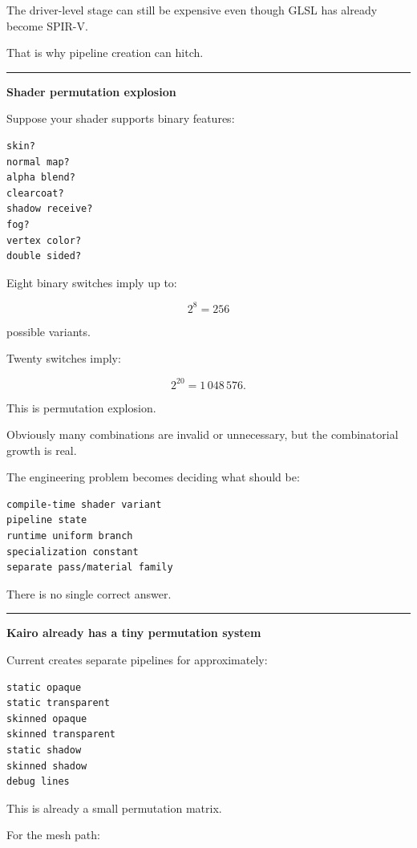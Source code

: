 The driver-level stage can still be expensive even though GLSL has already become SPIR-V.

That is why pipeline creation can hitch.

\begin{center}\rule{0.5\linewidth}{0.5pt}\end{center}

\textbf{Shader permutation explosion}

Suppose your shader supports binary features:

\begin{verbatim}
skin?
normal map?
alpha blend?
clearcoat?
shadow receive?
fog?
vertex color?
double sided?
\end{verbatim}

Eight binary switches imply up to:

\[
2^8=256
\]

possible variants.

Twenty switches imply:

\[
2^{20}=1\,048\,576.
\]

This is permutation explosion.

Obviously many combinations are invalid or unnecessary, but the combinatorial growth is real.

The engineering problem becomes deciding what should be:

\begin{verbatim}
compile-time shader variant
pipeline state
runtime uniform branch
specialization constant
separate pass/material family
\end{verbatim}

There is no single correct answer.

\begin{center}\rule{0.5\linewidth}{0.5pt}\end{center}

\textbf{Kairo already has a tiny permutation system}

Current  creates separate pipelines for approximately:

\begin{verbatim}
static opaque
static transparent
skinned opaque
skinned transparent
static shadow
skinned shadow
debug lines
\end{verbatim}

This is already a small permutation matrix.

For the mesh path:

